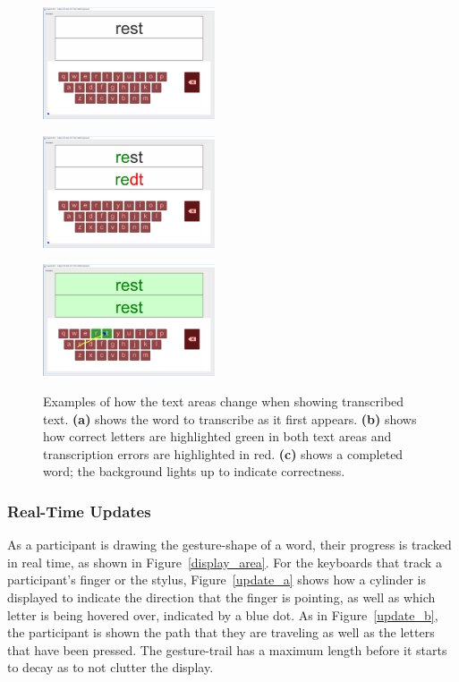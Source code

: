\begin{figure}[b]
	\centering
	\begin{minipage}[t]{1.9in}
		\includegraphics[width=2in]{fig_idle_keyboard}
		\label{text_a}
	\end{minipage}
	\begin{minipage}[t]{1.9in}
		\includegraphics[width=2in]{fig_error_keyboard}
		\label{text_b}
	\end{minipage}
	\begin{minipage}[t]{1.9in}
		\includegraphics[width=2in]{fig_correct_keyboard}
		\label{text_c}
	\end{minipage}
	\caption[Display: Text Area]{Examples of how the text areas change when showing transcribed text. \textbf{(a)} shows the word to transcribe as it first appears. \textbf{(b)} shows how correct letters are highlighted green in both text areas and transcription errors are highlighted in red. \textbf{(c)} shows a completed word; the background lights up to indicate correctness.}
	\label{text_area}
\end{figure}

\subsubsection{Real-Time Updates}
As a participant is drawing the gesture-shape of a word, their progress is tracked in real time, as shown in Figure~\ref{display_area}. For the keyboards that track a participant's finger or the stylus, Figure~\ref{update_a} shows how a cylinder is displayed to indicate the direction that the finger is pointing, as well as which letter is being hovered over, indicated by a blue dot. As in Figure~\ref{update_b}, the participant is shown the path that they are traveling as well as the letters that have been pressed. The gesture-trail has a maximum length before it starts to decay as to not clutter the display. 

